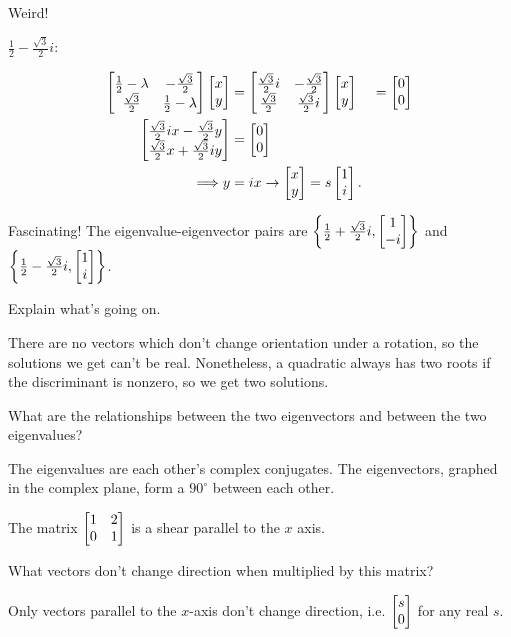 \documentclass[../gatm_answers.tex]{subfiles}
\begin{document}
Weird!

$\frac{1}{2} - \frac{\sqrt{3}}{2}i:$

\begin{align*}
\begin{bmatrix} \frac{1}{2} - \lambda & -\frac{\sqrt{3}}{2} \\ \frac{\sqrt{3}}{2} & \frac{1}{2} - \lambda \end{bmatrix}\begin{bmatrix} x \\ y \end{bmatrix} &= \begin{bmatrix} \frac{\sqrt{3}}{2}i & -\frac{\sqrt{3}}{2} \\ \frac{\sqrt{3}}{2} & \frac{\sqrt{3}}{2}i \end{bmatrix}\begin{bmatrix} x \\ y \end{bmatrix} &= \begin{bmatrix} 0 \\ 0 \end{bmatrix} \\
\begin{bmatrix} \frac{\sqrt{3}}{2}ix-\frac{\sqrt{3}}{2}y \\ \frac{\sqrt{3}}{2}x+\frac{\sqrt{3}}{2}iy \end{bmatrix} &= \begin{bmatrix} 0 \\ 0 \end{bmatrix} \\
\Longrightarrow y &= ix \rightarrow \begin{bmatrix} x \\ y \end{bmatrix} = s\begin{bmatrix} 1 \\ i \end{bmatrix}.
\end{align*}

Fascinating! The eigenvalue-eigenvector pairs are $\left\{\frac{1}{2} + \frac{\sqrt{3}}{2}i, \begin{bmatrix} 1 \\ -i \end{bmatrix}\right\}$ and $\left\{\frac{1}{2} - \frac{\sqrt{3}}{2}i, \begin{bmatrix} 1 \\ i \end{bmatrix}\right\}$.

\begin{inner_problem}
\item Explain what's going on.
\end{inner_problem}

There are no vectors which don't change orientation under a rotation, so the solutions we get can't be real. Nonetheless, a quadratic always has two roots if the discriminant is nonzero, so we get two solutions.

\begin{inner_problem}
\item What are the relationships between the two eigenvectors and between the two eigenvalues?
\end{inner_problem}

The eigenvalues are each other's complex conjugates. The eigenvectors, graphed in the complex plane, form a $90^\circ$ between each other.

\begin{outer_problem}
\item The matrix $\begin{bmatrix} 1 & 2 \\ 0 & 1 \end{bmatrix}$ is a shear parallel to the $x$ axis.
\end{outer_problem}

\begin{inner_problem}[start=1]
\item What vectors don't change direction when multiplied by this matrix?
\end{inner_problem}

Only vectors parallel to the $x$-axis don't change direction, i.e. $\begin{bmatrix} s \\ 0 \end{bmatrix}$ for any real $s$.
\end{document}
